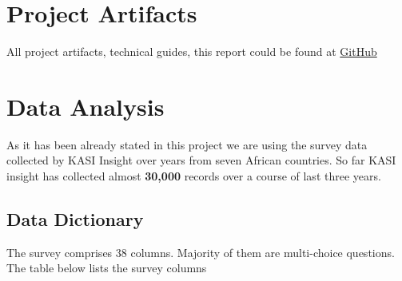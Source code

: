 \hypertarget{project-artifacts}{%
\section{Project Artifacts}\label{project-artifacts}}

All project artifacts, technical guides, this report could be found at
\href{https://github.com/v2msLabs/ML1030-Capstone-Project}{GitHub}

\hypertarget{data-analysis}{%
\section{Data Analysis}\label{data-analysis}}

As it has been already stated in this project we are using the survey
data collected by KASI Insight over years from seven African countries.
So far KASI insight has collected almost \textbf{30,000} records over a
course of last three years.

\hypertarget{data-dictionary}{%
\subsection{Data Dictionary}\label{data-dictionary}}

The survey comprises 38 columns. Majority of them are multi-choice
questions. The table below lists the survey columns

